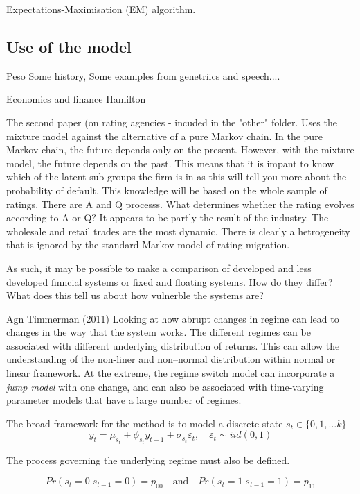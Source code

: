 \documentclass[12pt, a4paper, oneside]{article} %
\begin{document}
Expectations-Maximisation (EM) algorithm. 


\subsection{Use of the model}
Peso
Some history, 
Some examples from genetriics and speech....

Economics and finance
Hamilton

The second paper (on rating agencies - incuded in the "other" folder.  Uses the mixture model against the alternative of a pure Markov chain. In the pure Markov chain, the future depends only on the present.  However, with the mixture model, the future depends on the past.  This means that it is impant to know which of the latent sub-groups the firm is in as this will tell you more about the probability of default.  This knowledge will be based on the whole sample of ratings. There are A and Q processs.  What determines whether the rating evolves according to A or Q?  It appears to be partly the result of the industry.  The wholesale and retail trades are the most dynamic. There is clearly a hetrogeneity that is ignored by the standard Markov model of rating migration. 

As such, it may be possible to make a comparison of developed and less developed finncial systems or fixed and floating systems.  How do they differ?  What does this tell us about how vulnerble the systems are?  


Agn Timmerman (2011)
Looking at how abrupt changes in regime can lead to changes in the way that the system works.  The different regimes can be associated with different underlying distribution of returns.  This can allow the understanding of the non-liner and non--normal distribution within  normal or linear framework.  At the extreme, the regime switch model can incorporate a \emph{jump model} with one change, and can also be associated with time-varying parameter models that have a large number of regimes.

The broad framework for the method is to model a discrete state $s_t \in \{0,1,\dots k \}$
\begin{equation}
y_t = \mu_{s_t} + \phi_{s_t} y_{t-1} + \sigma_{s_t} \varepsilon_t, \quad \varepsilon_t \sim iid(0,1) 
\end{equation}

The process governing the underlying regime must also be defined. 

\begin{equation}
Pr(s_t = 0| s_{t-1} = 0) = p_{00} \quad \text{and} \quad Pr(s_t = 1| s_{t-1} = 1) = p_{11}
\end{equation}
\end{document}
